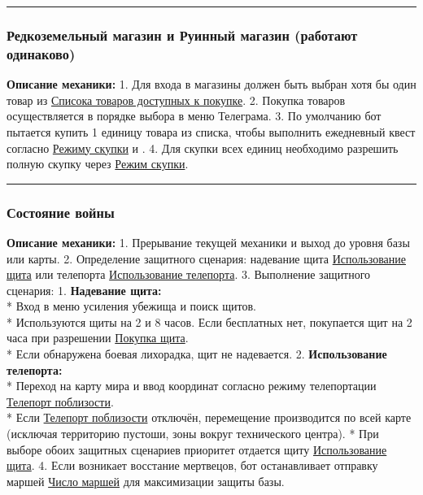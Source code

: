\documentclass[
]{article}
\begin{document}
\begin{center}\rule{0.5\linewidth}{0.5pt}\end{center}

\subsubsection{Редкоземельный магазин и Руинный магазин (работают
одинаково)}\label{ux440ux435ux434ux43aux43eux437ux435ux43cux435ux43bux44cux43dux44bux439-ux43cux430ux433ux430ux437ux438ux43d-ux438-ux440ux443ux438ux43dux43dux44bux439-ux43cux430ux433ux430ux437ux438ux43d-ux440ux430ux431ux43eux442ux430ux44eux442-ux43eux434ux438ux43dux430ux43aux43eux432ux43e}

\textbf{Описание механики:} 1. Для входа в магазины должен быть выбран
хотя бы один товар из \hyperref[rare_metal_item_list]{Списока товаров
доступных к покупке}. 2. Покупка товаров осуществляется в порядке выбора
в меню Телеграма. 3. По умолчанию бот пытается купить 1 единицу товара
из списка, чтобы выполнить ежедневный квест согласно
\hyperref[rare_metal_store_mode]{Режиму скупки} и . 4. Для скупки всех
единиц необходимо разрешить полную скупку через
\hyperref[rare_metal_store_mode]{Режим скупки}.

\begin{center}\rule{0.5\linewidth}{0.5pt}\end{center}

\subsubsection{Состояние
войны}\label{ux441ux43eux441ux442ux43eux44fux43dux438ux435-ux432ux43eux439ux43dux44b}

\textbf{Описание механики:} 1. Прерывание текущей механики и выход до
уровня базы или карты. 2. Определение защитного сценария: надевание щита
\hyperref[war_shield_activate]{Использование щита} или телепорта
\hyperref[war_teleport_activate]{Использование телепорта}. 3. Выполнение
защитного сценария: 1. \textbf{Надевание щита:}\\
* Вход в меню усиления убежища и поиск щитов.\\
* Используются щиты на 2 и 8 часов. Если бесплатных нет, покупается щит
на 2 часа при разрешении \hyperref[war_diamond_shield]{Покупка щита}.\\
* Если обнаружена боевая лихорадка, щит не надевается. 2.
\textbf{Использование телепорта:}\\
* Переход на карту мира и ввод координат согласно режиму телепортации
\hyperref[war_teleport_nearest]{Телепорт поблизости}.\\
* Если \hyperref[war_teleport_nearest]{Телепорт поблизости} отключён,
перемещение производится по всей карте (исключая территорию пустоши,
зоны вокруг технического центра). * При выборе обоих защитных сценариев
приоритет отдается щиту \hyperref[war_shield_activate]{Использование
щита}. 4. Если возникает восстание мертвецов, бот останавливает отправку
маршей \hyperref[march_max_count]{Число маршей} для максимизации защиты
базы.
\end{document}
